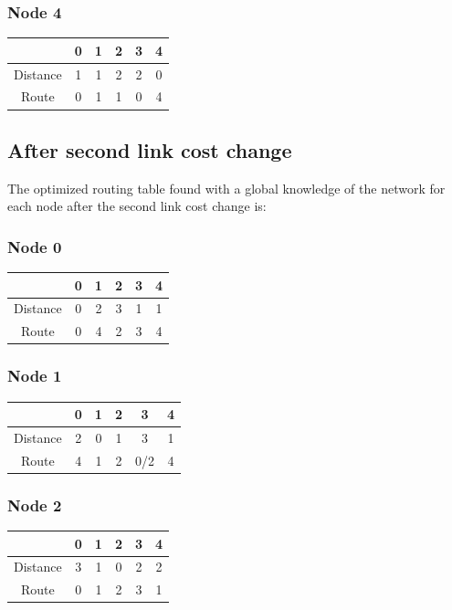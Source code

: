 \documentclass[a4paper,11pt,final]{report}
\begin{document}
\subsubsection{Node 4}

\begin{tabular}{|c|c|c|c|c|c|}
\hline
& 0 & 1 & 2 & 3 & 4 \\ \hline
Distance & 1 & 1 & 2 & 2 & 0 \\ \hline
Route & 0 & 1 & 1 & 0 & 4 \\ \hline
\end{tabular}

\subsection{After second link cost change}

The optimized routing table found with a global knowledge of the network
for each node after the second link cost change is:

\subsubsection{Node 0}

\begin{tabular}{|c|c|c|c|c|c|}
\hline
& 0 & 1 & 2 & 3 & 4 \\ \hline
Distance & 0 & 2 & 3 & 1 & 1 \\ \hline
Route & 0 & 4 & 2 & 3 & 4 \\ \hline
\end{tabular}

\subsubsection{Node 1}

\begin{tabular}{|c|c|c|c|c|c|}
\hline
& 0 & 1 & 2 & 3 & 4 \\ \hline
Distance & 2 & 0 & 1 & 3 & 1 \\ \hline
Route & 4 & 1 & 2 & 0/2 & 4 \\ \hline
\end{tabular}

\subsubsection{Node 2}

\begin{tabular}{|c|c|c|c|c|c|}
\hline
& 0 & 1 & 2 & 3 & 4 \\ \hline
Distance & 3 & 1 & 0 & 2 & 2 \\ \hline
Route & 0 & 1 & 2 & 3 & 1 \\ \hline
\end{tabular}
\end{document}
